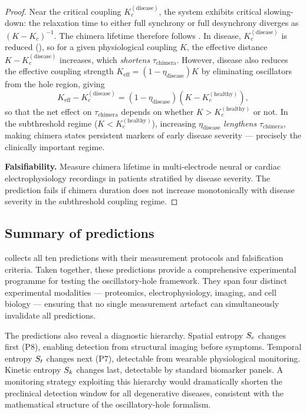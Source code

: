 \begin{proof}
Near the critical coupling $K_c^{(\mathrm{disease})}$, the system exhibits
critical slowing-down: the relaxation time to either full synchrony or full
desynchrony diverges as $(K - K_c)^{-1}$.  The chimera lifetime therefore
follows .  In disease, $K_c^{(\mathrm{disease})}$
is reduced (), so for a given physiological coupling $K$,
the effective distance $K - K_c^{(\mathrm{disease})}$ increases, which
\emph{shortens} $\tau_{\mathrm{chimera}}$.  However, disease also reduces the
effective coupling strength $K_{\mathrm{eff}} = (1 - \eta_{\mathrm{disease}}) K$
by eliminating oscillators from the hole region, giving
\begin{equation}
  K_{\mathrm{eff}} - K_c^{(\mathrm{disease})}
  = (1 - \eta_{\mathrm{disease}})(K - K_c^{(\mathrm{healthy})}),
  \label{eq:ch07-effective-distance}
\end{equation}
so that the net effect on $\tau_{\mathrm{chimera}}$ depends on whether
$K > K_c^{(\mathrm{healthy})}$ or not.  In the subthreshold regime
($K < K_c^{(\mathrm{healthy})}$), increasing $\eta_{\mathrm{disease}}$
\emph{lengthens} $\tau_{\mathrm{chimera}}$, making chimera states persistent
markers of early disease severity — precisely the clinically important regime.

\textbf{Falsifiability.}  Measure chimera lifetime in multi-electrode neural
or cardiac electrophysiology recordings in patients stratified by disease
severity.  The prediction fails if chimera duration does not increase
monotonically with disease severity in the subthreshold coupling regime.
\end{proof}

\subsection{Summary of predictions}
\label{sec:ch07-pred-summary}

 collects all ten predictions with their
measurement protocols and falsification criteria.  Taken together, these
predictions provide a comprehensive experimental programme for testing the
oscillatory-hole framework.  They span four distinct experimental modalities —
proteomics, electrophysiology, imaging, and cell biology — ensuring that no
single measurement artefact can simultaneously invalidate all predictions.

The predictions also reveal a diagnostic hierarchy.  Spatial entropy $S_e$
changes first (P8), enabling detection from structural imaging before symptoms.
Temporal entropy $S_t$ changes next (P7), detectable from wearable
physiological monitoring.  Kinetic entropy $S_k$ changes last, detectable by
standard biomarker panels.  A monitoring strategy exploiting this hierarchy
would dramatically shorten the preclinical detection window for all
degenerative diseases, consistent with the mathematical structure of the
oscillatory-hole formalism.

